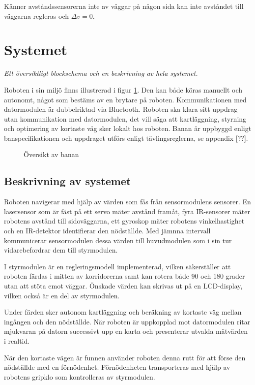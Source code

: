 \documentclass[11pt]{article}
\begin{document}
\begin{flushleft}
Känner avståndssensorerna inte av väggar på någon sida kan inte avståndet till väggarna regleras och $\Delta v = 0$.

\section{Systemet}
\textit{Ett översiktligt blockschema och en beskrivning av hela systemet.}

Roboten i sin miljö finns illustrerad i figur \ref{system}. Den kan både köras manuellt och autonomt, något som bestäms av en brytare på roboten. Kommunikationen med datormodulen är dubbelriktad via Bluetooth\textsuperscript{\circledR}. Roboten ska klara sitt uppdrag utan kommunikation med datormodulen, det vill säga att kartläggning, styrning och optimering av kortaste väg sker lokalt hos roboten. Banan är uppbyggd enligt banspecifikationen och uppdraget utförs enligt tävlingsreglerna, se appendix [??].

\begin{figure}[htbp]
\centering
\noindent\resizebox{.8\linewidth}{!}{
	}
	\caption{Översikt av banan\label{system}}	
\end{figure}

\subsection{Beskrivning av systemet}
Roboten navigerar med hjälp av värden som fås från sensormodulens sensorer. En lasersensor som är fäst på ett servo mäter avstånd framåt, fyra IR-sensorer mäter robotens avstånd till sidoväggarna, ett gyroskop mäter robotens vinkelhastighet och en IR-detektor identifierar den nödställde. Med jämnna intervall kommunicerar sensormodulen dessa värden till huvudmodulen som i sin tur vidarebefordrar dem till styrmodulen. 

I styrmodulen är en regleringsmodell implementerad, vilken säkerställer att roboten färdas i mitten av korridorerna samt kan rotera både 90 och 180 grader utan att stöta emot väggar. Önskade värden kan skrivas ut på en LCD-display, vilken också är en del av styrmodulen.

Under färden sker autonom kartläggning och beräkning av kortaste väg mellan ingången och den nödställde. När roboten är uppkopplad mot datormodulen ritar mjukvaran på datorn successivt upp en karta och presenterar utvalda mätvärden i realtid. 

När den kortaste vägen är funnen använder roboten denna rutt för att förse den nödställde med en förnödenhet. Förnödenheten transporteras med hjälp av robotens gripklo som kontrolleras av styrmodulen.


\end{flushleft}
\end{document}
